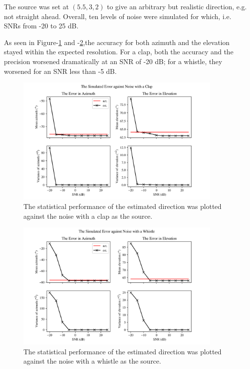 \documentclass[notitlepage]{report}
\begin{document}
The source was set at $(5.5,3,2)$ to give an arbitrary but realistic direction, e.g. not straight ahead. Overall, ten levels of noise were simulated for which, i.e. SNRs from -20 to 25 \si{dB}.

As seen in Figure-\ref{fig:mm_noise_plots_clap} and -\ref{fig:mm_noise_plots_whistle},the accuracy for both azimuth and the elevation stayed within the expected resolution. For a clap, both the accuracy and the precision worsened dramatically at an SNR of -20 \si{dB}; for a whistle, they worsened for an SNR less than -5 \si{dB}.

\begin{figure}[H]
\includegraphics[width=0.9\textwidth]{../Python/main_method/noise/clap/plots.png}
\centering
\caption{The statistical performance of the estimated direction was plotted against the noise with a clap as the source.}
\label{fig:mm_noise_plots_clap}
\centering
\end{figure}

\begin{figure}[H]
\includegraphics[width=0.9\textwidth]{../Python/main_method/noise/whistle/plots.png}
\centering
\caption{The statistical performance of the estimated direction was plotted against the noise with a whistle as the source.}
\label{fig:mm_noise_plots_whistle}
\centering
\end{figure}
\end{document}
